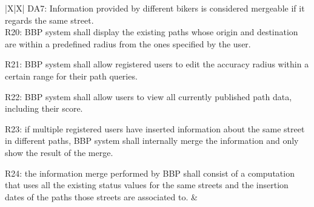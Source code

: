\documentclass{article}
\begin{document}
\begin{xltabular}{\textwidth}{|X|X|}
    DA7: Information provided by different bikers is considered mergeable if it regards the same street.
    \\
    \hline
    R20: BBP system shall display the existing paths whose origin and destination are within a predefined radius from the ones specified by the user. \par
    R21: BBP system shall allow registered users to edit the accuracy radius within a certain range for their path queries.  \par
    R22: BBP system shall allow users to view all currently published path data, including their score. \par
    R23: if multiple registered users have inserted information about the same street in different paths, BBP system shall internally merge the information and only show the result of the merge. \par
    R24: the information merge performed by BBP shall consist of a computation that uses all the existing status values for the same streets and the insertion dates of the paths those streets are associated to.
    & \par
    \\
    \hline
\end{xltabular}
\end{document}

